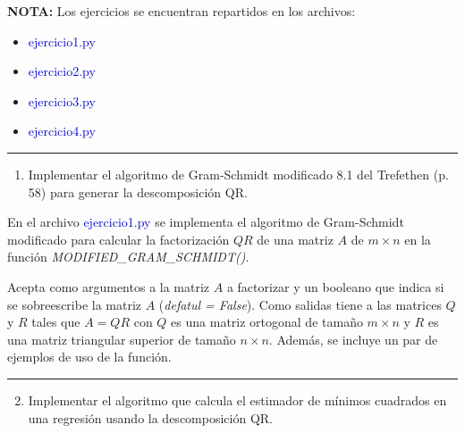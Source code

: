 \textcolor{BrickRed}{\bf NOTA:}  Los ejercicios se encuentran repartidos en los archivos:
\begin{itemize}
	\item \textcolor{mediumblue}{ejercicio1.py}
	\item \textcolor{mediumblue}{ejercicio2.py}
	\item \textcolor{mediumblue}{ejercicio3.py}
	\item \textcolor{mediumblue}{ejercicio4.py}
\end{itemize}

\vspace{5mm}
{\color{lightgray} \hrule}
\begin{enumerate}
	\item Implementar el algoritmo de Gram-Schmidt modificado 8.1 del Trefethen (p. 58) para generar la descomposición QR.
\end{enumerate}
En el archivo \textcolor{mediumblue}{ejercicio1.py} se implementa el algoritmo de Gram-Schmidt modificado para calcular la factorización $QR$ de una matriz $A$ de $m\times n$ en la función \textit{MODIFIED\_GRAM\_SCHMIDT()}.

Acepta como argumentos a la matriz $A$ a factorizar y un booleano que indica si se sobreescribe la matriz $A$ (\textit{defatul = False}). Como salidas tiene a las matrices $Q$ y $R$ tales que $A = QR$ con $Q$ es una matriz ortogonal de tamaño $m\times n$ y $R$ es una matriz triangular superior de tamaño $n \times n$. Además, se incluye un par de ejemplos de uso de la función.

\vspace{5mm}
{\color{lightgray} \hrule}
\begin{enumerate} \setcounter{enumi}{1}
	\item Implementar el algoritmo que calcula el estimador de mínimos cuadrados en una regresión usando la descomposición QR.
\end{enumerate}

